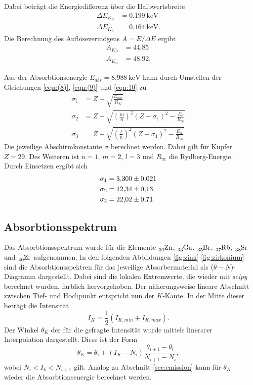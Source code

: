 Dabei beträgt die Energiedifferenz über die Halbwertsbreite
\begin{align*}
    \Delta E_{K_\beta}  &= \SI{0.199}{\kilo\electronvolt}\\
    \Delta E_{K_\alpha} &= \SI{0.164}{\kilo\electronvolt}   .
\end{align*}
Die Berechnung des Auflösevermögens $A=E/\Delta E$ ergibt
\begin{align*}
    A_{K_\beta}  &= \num{44.85}\\
    A_{K_\alpha} &= \num{48.92} .
\end{align*}

Aus der Absorbtionsenergie $E_{abs}=\SI{8.988}{\kilo\electronvolt}$ \cite{AP04} kann durch Umstellen der Gleichungen \eqref{eqn:(8)},
\eqref{eqn:(9)} und \eqref{eqn:10} zu
\begin{align*}
    \sigma_1&=Z-\sqrt{\frac{E_{abs}}{R_\infty}}\\
    \sigma_2&=Z-\sqrt{\left(\frac{m}{n}\right)^2(Z-\sigma_1)^2-\frac{E_\alpha}{R_\infty}}\\
    \sigma_3&=Z-\sqrt{\left(\frac{l}{n}\right)^2(Z-\sigma_1)^2-\frac{E_\alpha}{R_\infty}}
\end{align*}
Die jeweilige Abschirmkonstante $\sigma$ berechnet werden. Dabei gilt für Kupfer $Z=\num{29}$. Des Weiteren ist $n=1$, $m=2$, $l=3$
und $R_\infty$ die Rydberg-Energie. Durch Einsetzen ergibt sich
\begin{align*}
    \sigma_1&=\num{3.30  \pm 0.021}\\
    \sigma_2&=\num{12.34 \pm 0.13 }\\
    \sigma_3&=\num{22.02 \pm 0.71 }   .
\end{align*}

\subsection{Absorbtionsspektrum}
\label{sec:absorb}
Das Absorbtionsspektrum wurde für die Elemente $\ce{_{30}Zn}$, $\ce{_{33}Ga}$, $\ce{_{35}Br}$, $\ce{_{37}Rb}$, $\ce{_{38}Sr}$ und
$\ce{_{40}Zr}$ aufgenommen. In den folgenden Abbildungen \ref{fig:zink}-\ref{fig:zirkonium} sind die Absorbtionsspektren für das jeweilige
Absorbermaterial als ($\theta-N$)-Diagramm dargestellt. Dabei sind die lokalen Extremwerte, die wieder mit \textit{scipy} \cite{scipy}
berechnet wurden, farblich hervorgehoben. Der näherungsweise lineare Abschnitt zwischen Tief- und Hochpunkt entspricht nun der
$K$-Kante. In der Mitte dieser beträgt die Intensität
\begin{equation*}
    I_K=\frac{1}{2}(I_{K,min}+I_{K,max})   .
\end{equation*}
Der Winkel $\theta_K$ der für die gefragte Intensität wurde mittels linerarer Interpolation dargestellt. Diese ist der Form
\begin{equation*}
    \theta_K=\theta_i+(I_K-N_i)\frac{\theta_{i+1}-\theta_i}{N_{i+1}-N_i},
\end{equation*}
wobei $N_i<I_k<N_{i+1}$ gilt. Analog zu Abschnitt \ref{sec:emission} kann für $\theta_K$ wieder die Absorbtionsenergie berechnet werden.

